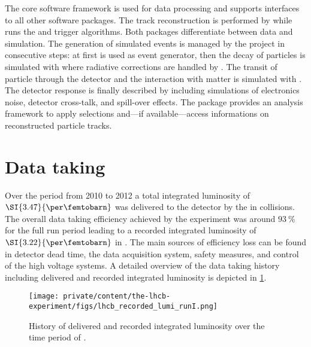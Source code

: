 The \LHCb core software framework \Gaudi \cite{set:soft:gaudi} is used for data
processing and supports interfaces to all other software packages. The track
reconstruction is performed by \Brunel \cite{soft:brunel} while \Moore
\cite{soft:moore} runs the \HLTOne and \HLTTwo trigger algorithms. Both packages
differentiate between data and simulation. The generation of simulated events is
managed by the \Gauss \cite{set:soft:gauss} project in consecutive steps: at
first \Pythia \cite{set:soft:pythia} is used as event generator, then the decay
of particles is simulated with \EvtGen \cite{Lange:2001uf} where radiative
corrections are handled by \Photos \cite{set:soft:photos}. The transit of
particle through the detector and the interaction with matter is simulated with
\GeantFour \cite{set:soft:geantfour}. The detector response is finally described
by \Boole \cite{soft:boole} including simulations of electronics noise, detector
cross-talk, and spill-over effects. The \DaVinci \cite{soft:davinci} package
provides an analysis framework to apply selections and---if available---access
\MC informations on reconstructed particle tracks.

\section{Data taking}
\label{sec:lhcb_experiment:data}

Over the \RunOne period from 2010 to 2012 a total integrated luminosity of
$\SI{3.47}{\per\femtobarn}$ was delivered to the \LHCb detector by the \LHC in
\protonproton collisions. The overall data taking efficiency achieved by the
experiment was around $\SI{93}{\percent}$ for the full run period leading to a
recorded integrated luminosity of $\SI{3.22}{\per\femtobarn}$ in \RunOne. The
main sources of efficiency loss can be found in detector dead time, the data
acquisition system, \VELO safety measures, and control of the high voltage
systems. A detailed overview of the data taking history including delivered and
recorded integrated luminosity is depicted in
\cref{fig:lhcb_experiment:data:integrated_lumi}.
%
\begin{figure}[t]
  \centering
  \texttt{[image: private/content/the-lhcb-experiment/figs/lhcb\_recorded\_lumi\_runI.png]}
  \caption{
    History of delivered and recorded integrated luminosity over the time period
  of \RunOne \cite{lhcb:luminosity}. }
  \label{fig:lhcb_experiment:data:integrated_lumi}
\end{figure}


